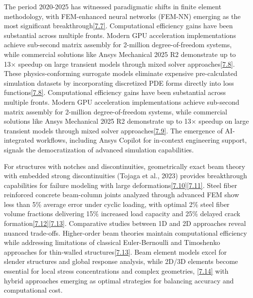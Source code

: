 \documentclass[12pt,a4paper]{report}
\begin{document}
The period 2020-2025 has witnessed paradigmatic shifts in finite element methodology, with FEM-enhanced neural networks (FEM-NN) emerging as the most significant breakthrough\href{https://www.sciencedirect.com/science/article/pii/S2352012422000947}{[7.7]}. Computational efficiency gains have been substantial across multiple fronts. Modern GPU acceleration implementations achieve sub-second matrix assembly for 2-million degree-of-freedom systems, while commercial solutions like Ansys Mechanical 2025 R2 demonstrate up to 13× speedup on large transient models through mixed solver approaches\href{https://amses-journal.springeropen.com/articles/10.1186/s40323-023-00243-1}{[7.8]}. These physics-conforming surrogate models eliminate expensive pre-calculated simulation datasets by incorporating discretized PDE forms directly into loss functions\href{https://amses-journal.springeropen.com/articles/10.1186/s40323-023-00243-1}{[7.8]}. Computational efficiency gains have been substantial across multiple fronts. Modern GPU acceleration implementations achieve sub-second matrix assembly for 2-million degree-of-freedom systems, while commercial solutions like Ansys Mechanical 2025 R2 demonstrate up to 13× speedup on large transient models through mixed solver approaches\href{https://www.researchgate.net/publication/236634336_GPU_acceleration_for_FEM-based_structural_analysis}{[7.9]}. The emergence of AI-integrated workflows, including Ansys Copilot for in-context engineering support, signals the democratization of advanced simulation capabilities. 

For structures with notches and discontinuities, geometrically exact beam theory with embedded strong discontinuities (Tojaga et al., 2023) provides breakthrough capabilities for failure modeling with large deformations\href{https://www.sciencedirect.com/science/article/pii/S0045782523001378}{[7.10]}\href{https://www.researchgate.net/publication/367973333_Geometrically_Exact_Beam_Theory_with_Embedded_Strong_Discontinuities_for_the_Modeling_of_Failure_in_Structures_Part_I_Formulation_and_Finite_Element_Implementation}{[7.11]}. Steel fiber reinforced concrete beam-column joints analyzed through advanced FEM show less than 5\% average error under cyclic loading, with optimal 2\% steel fiber volume fractions delivering 15\% increased load capacity and 25\% delayed crack formation\href{https://www.nature.com/articles/s41598-024-69270-1}{[7.12]}\href{https://www.nature.com/articles/s41598-024-69270-1}{[7.13]}. Comparative studies between 1D and 2D approaches reveal nuanced trade-offs. Higher-order beam theories maintain computational efficiency while addressing limitations of classical Euler-Bernoulli and Timoshenko approaches for thin-walled structures\href{https://www.sciencedirect.com/science/article/pii/S2352012420303854}{[7.13]}. Beam element models excel for slender structures and global response analysis, while 2D/3D elements become essential for local stress concentrations and complex geometries, \href{https://en.wikipedia.org/wiki/Euler%E2%80%93Bernoulli_beam_theory}{[7.14]} with hybrid approaches emerging as optimal strategies for balancing accuracy and computational cost.
\end{document}
